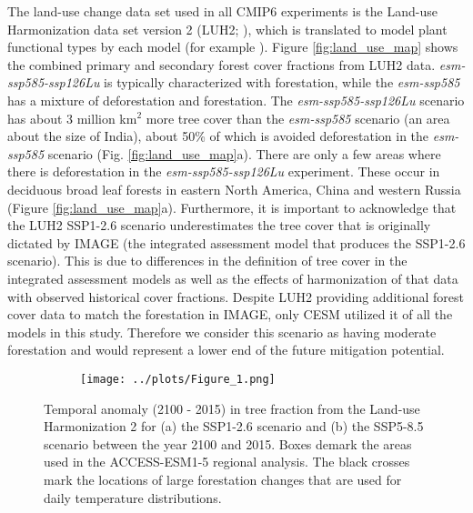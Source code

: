 \documentclass[]{article}
\begin{document}
The land-use change data set used in all CMIP6 experiments is the Land-use Harmonization data set version 2 (LUH2; \cite{hurtt_harmonization_2020}), which is translated to model plant functional types by each model (for example \cite{di_vittorio_land_2014}).
Figure \ref{fig:land_use_map} shows the combined primary and secondary forest cover fractions from LUH2 data.
\textit{esm-ssp585-ssp126Lu} is typically characterized with forestation, while the \textit{esm-ssp585} has a mixture of deforestation and forestation.
The \textit{esm-ssp585-ssp126Lu} scenario has about 3 million km$^2$ more tree cover than the \textit{esm-ssp585} scenario (an area about the size of India), about 50\%  of which is avoided deforestation in the \textit{esm-ssp585} scenario (Fig. \ref{fig:land_use_map}a).
There are only a few areas where there is deforestation in the \textit{esm-ssp585-ssp126Lu} experiment.
These occur in deciduous broad leaf forests in eastern North America, China and western Russia (Figure \ref{fig:land_use_map}a).
Furthermore, it is important to acknowledge that the LUH2 SSP1-2.6 scenario underestimates the tree cover that is originally dictated by IMAGE (the integrated assessment model that produces the SSP1-2.6 scenario).
This is due to differences in the definition of tree cover in the integrated assessment models as well as the effects of harmonization of that data with observed historical cover fractions.
Despite LUH2 providing additional forest cover data to match the forestation in IMAGE, only CESM utilized it of all the models in this study.
Therefore we consider this scenario as having moderate forestation and would represent a lower end of the future mitigation potential.

\begin{figure}[H]
    \centering
    \begin{subfigure}[b]{\linewidth}
        \texttt{[image: ../plots/Figure\_1.png]}
    \end{subfigure}
    \caption{Temporal anomaly (2100 - 2015) in tree fraction from the Land-use Harmonization 2 for (a) the SSP1-2.6 scenario and (b) the SSP5-8.5 scenario between the year 2100 and 2015. Boxes demark the areas used in the ACCESS-ESM1-5 regional analysis. The black crosses mark the locations of large forestation changes that are used for daily temperature distributions.}
    \label{fig:land_use}
\end{figure}
\end{document}
